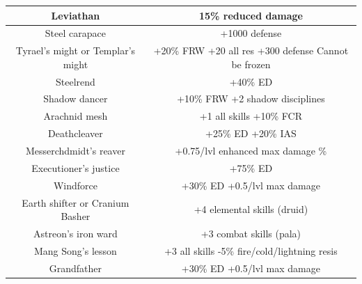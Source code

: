 \documentclass[12pt,a4paper]{article}
\begin{document}
\begin{center}
{\begin{tabular}{|c|c|}
\hline
Leviathan&15\% reduced damage\\
\hline
Steel carapace&+1000 defense\\
\hline
Tyrael's might or Templar's might&+20\% FRW +20 all res +300 defense Cannot be frozen\\
\hline
Steelrend&+40\% ED\\
\hline
Shadow dancer&+10\% FRW +2 shadow disciplines\\
\hline
Arachnid mesh&+1 all skills +10\% FCR\\
\hline
Deathcleaver&+25\% ED +20\% IAS\\
\hline
Messerchdmidt's reaver&+0.75/lvl enhanced max damage \%\\
\hline
Executioner's justice&+75\% ED\\
\hline
Windforce&+30\% ED +0.5/lvl max damage\\
\hline
Earth shifter or Cranium Basher&+4 elemental skills (druid)\\
\hline
Astreon's iron ward&+3 combat skills (pala)\\
\hline
Mang Song's lesson&+3 all skills -5\% fire/cold/lightning resis\\
\hline
Grandfather&+30\% ED +0.5/lvl max damage\\
\hline
\end{tabular}
}
\end{center}

\begin{center}
\end{center}
\end{document}
